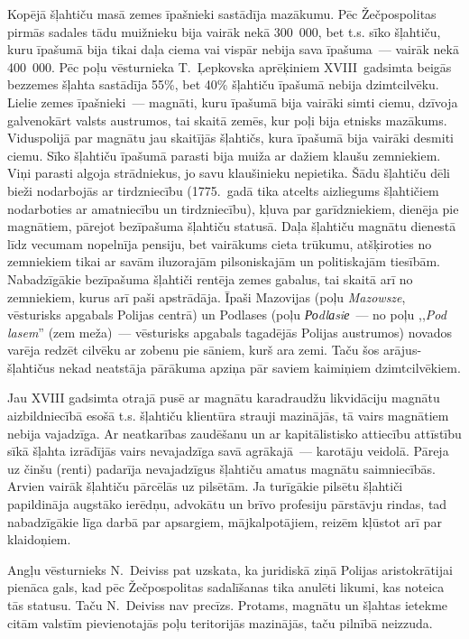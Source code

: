 \documentclass[twoside,a5paper,12pt,fleqn,openany]{extbook}
\newcommand{\pltxti}[1]{\textit{\textpolish{#1}}}
\begin{document}
Kopējā šļahtiču masā zemes īpašnieki sastādīja mazākumu. Pēc Žečpospolitas pirmās sadales tādu muižnieku bija vairāk nekā 300~000, bet t.s. sīko šļahtiču, kuru īpašumā bija tikai daļa ciema vai vispār nebija sava īpašuma~--- vairāk nekā 400~000. Pēc poļu vēsturnieka T.~Ļepkovska aprēķiniem XVIII~gadsimta beigās bezzemes šļahta sastādīja 55\%, bet 40\% šļahtiču īpašumā nebija dzimtcilvēku. Lielie zemes īpašnieki~--- magnāti, kuru īpašumā bija vairāki simti ciemu, dzīvoja galvenokārt valsts austrumos, tai skaitā zemēs, kur poļi bija etnisks mazākums. Viduspolijā par magnātu jau skaitījās šļahtičs, kura īpašumā bija vairāki desmiti ciemu. Sīko šļahtiču īpašumā parasti bija muiža ar dažiem klaušu zemniekiem. Viņi parasti algoja strādniekus, jo savu klaušinieku nepietika. Šādu šļahtiču dēli bieži nodarbojās ar tirdzniecību (1775.~gadā tika atcelts aizliegums šļahtičiem nodarboties ar amatniecību un tirdzniecību), kļuva par garīdzniekiem, dienēja pie magnātiem, pārejot bezīpašuma šļahtiču statusā. Daļa šļahtiču magnātu dienestā līdz vecumam nopelnīja pensiju, bet vairākums cieta trūkumu, atšķiroties no zemniekiem tikai ar savām iluzorajām pilsoniskajām un politiskajām tiesībām. Nabadzīgākie bezīpašuma šļahtiči rentēja zemes gabalus, tai skaitā arī no zemniekiem, kurus arī paši apstrādāja. Īpaši Mazovijas (poļu \pltxti{Mazowsze}, vēsturisks apgabals Polijas centrā) un Podlases (poļu \pltxti{Роdlаsiе}~--- no poļu ,,\pltxti{Pod lasem}'' (zem meža)~--- vēsturisks apgabals tagadējās Polijas austrumos) novados varēja redzēt cilvēku ar zobenu pie sāniem, kurš ara zemi. Taču šos arājus-šļahtičus nekad neatstāja pārākuma apziņa pār saviem kaimiņiem dzimtcilvēkiem.

Jau XVIII gadsimta otrajā pusē ar magnātu karadraudžu likvidāciju magnātu aizbildniecībā esošā t.s. šļahtiču klientūra strauji mazinājās, tā vairs magnātiem nebija vajadzīga. Ar neatkarības zaudēšanu un ar kapitālistisko attiecību attīstību sīkā šļahta izrādījās vairs nevajadzīga savā agrākajā~--- karotāju veidolā. Pāreja uz činšu (renti) padarīja nevajadzīgus šļahtiču amatus magnātu saimniecībās. Arvien vairāk šļahtiču pārcēlās uz pilsētām. Ja turīgākie pilsētu šļahtiči papildināja augstāko ierēdņu, advokātu un brīvo profesiju pārstāvju rindas, tad nabadzīgākie līga darbā par apsargiem, mājkalpotājiem, reizēm kļūstot arī par klaidoņiem.

Angļu vēsturnieks N.~Deiviss pat uzskata, ka juridiskā ziņā Polijas aristokrātijai pienāca gals, kad pēc Žečpospolitas sadalīšanas tika anulēti likumi, kas noteica tās statusu. Taču N.~Deiviss nav precīzs. Protams, magnātu un šļahtas ietekme citām valstīm pievienotajās poļu teritorijās mazinājās, taču pilnībā neizzuda.
\end{document}
